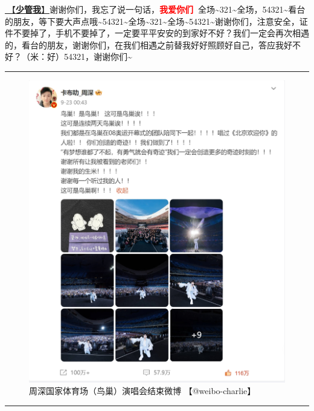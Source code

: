 \documentclass[]{ctexbook}
\begin{document}
\hyperref[watch-ur-manners]{🎵【\textbf{少管我}】}谢谢你们，我忘了说一句话，\textbf{\textcolor{red}{我爱你们~}}全场\textasciitilde321\textasciitilde 全场，54321\textasciitilde 看台的朋友，等下要大声点哦\textasciitilde54321\textasciitilde 全场\textasciitilde321\textasciitilde 全场\textasciitilde54321\textasciitilde 谢谢你们，注意安全，证件不要掉了，手机不要掉了，一定要平平安安的到家好不好？我们一定会再次相遇的，看台的朋友，谢谢你们，在我们相遇之前替我好好照顾好自己，答应我好不好？（米：好）54321，谢谢你们\textasciitilde{}

\begin{center}\rule{0.5\linewidth}{0.5pt}\end{center}

\begin{figure}

{\centering \includegraphics{img/weibo/beijing-20240923} 

}

\caption{周深国家体育场（鸟巢）演唱会结束微博 【@weibo-charlie】}\label{fig:unnamed-chunk-100}
\end{figure}

\begin{center}\rule{0.5\linewidth}{0.5pt}\end{center}
\end{document}
